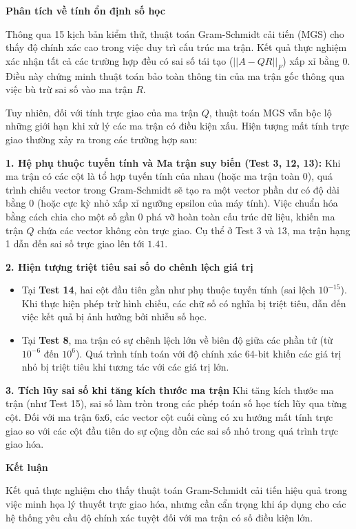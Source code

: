 \textbf{Phân tích về tính ổn định số học}

Thông qua 15 kịch bản kiểm thử, thuật toán Gram-Schmidt cải tiến (MGS) cho thấy độ chính xác cao trong việc duy trì cấu trúc ma trận. Kết quả thực nghiệm xác nhận tất cả các trường hợp đều có sai số tái tạo ($||A - QR||_F$) xấp xỉ bằng $0$. Điều này chứng minh thuật toán bảo toàn thông tin của ma trận gốc thông qua việc bù trừ sai số vào ma trận $R$.

Tuy nhiên, đối với tính trực giao của ma trận $Q$, thuật toán MGS vẫn bộc lộ những giới hạn khi xử lý các ma trận có điều kiện xấu. Hiện tượng mất tính trực giao thường xảy ra trong các trường hợp sau:

\textbf{1. Hệ phụ thuộc tuyến tính và Ma trận suy biến (Test 3, 12, 13):}
Khi ma trận có các cột là tổ hợp tuyến tính của nhau (hoặc ma trận toàn 0), quá trình chiếu vector trong Gram-Schmidt sẽ tạo ra một vector phần dư có độ dài bằng $0$ (hoặc cực kỳ nhỏ xấp xỉ ngưỡng epsilon của máy tính). Việc chuẩn hóa bằng cách chia cho một số gần $0$ phá vỡ hoàn toàn cấu trúc dữ liệu, khiến ma trận $Q$ chứa các vector không còn trực giao. Cụ thể ở Test 3 và 13, ma trận hạng 1 dẫn đến sai số trực giao lên tới $1.41$.

\textbf{2. Hiện tượng triệt tiêu sai số do chênh lệch giá trị}
\begin{itemize}
    \item Tại \textbf{Test 14}, hai cột đầu tiên gần như phụ thuộc tuyến tính (sai lệch $10^{-15}$). Khi thực hiện phép trừ hình chiếu, các chữ số có nghĩa bị triệt tiêu, dẫn đến việc kết quả bị ảnh hưởng bởi nhiễu số học.
    \item Tại \textbf{Test 8}, ma trận có sự chênh lệch lớn về biên độ giữa các phần tử (từ $10^{-6}$ đến $10^6$). Quá trình tính toán với độ chính xác 64-bit khiến các giá trị nhỏ bị triệt tiêu khi tương tác với các giá trị lớn.
\end{itemize}

\textbf{3. Tích lũy sai số khi tăng kích thước ma trận}
Khi tăng kích thước ma trận (như Test 15), sai số làm tròn trong các phép toán số học tích lũy qua từng cột. Đối với ma trận 6x6, các vector cột cuối cùng có xu hướng mất tính trực giao so với các cột đầu tiên do sự cộng dồn các sai số nhỏ trong quá trình trực giao hóa.

\textbf{Kết luận}

Kết quả thực nghiệm cho thấy thuật toán Gram-Schmidt cải tiến hiệu quả trong việc minh họa lý thuyết trực giao hóa, nhưng cần cẩn trọng khi áp dụng cho các hệ thống yêu cầu độ chính xác tuyệt đối với ma trận có số điều kiện lớn. 

